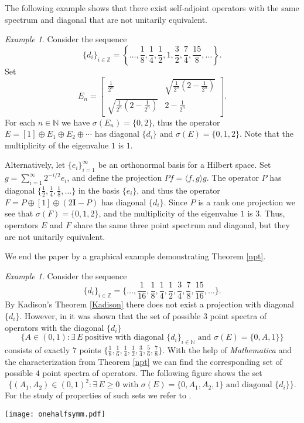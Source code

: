 \documentclass[12pt]{amsart}
\newcounter{Theorem}
\numberwithin{equation}{section}
\numberwithin{Theorem}{section}
\theoremstyle{plain}
\theoremstyle{definition}
\theoremstyle{remark}
\newtheorem{ex}[Theorem]{Example}
\begin{document}
The following example shows that there exist self-adjoint operators with the same spectrum and diagonal that are not unitarily equivalent. 

\begin{ex}\label{nu} Consider the sequence 
\[\{d_{i}\}_{i\in{\mathbb{Z}}} = \left\{\ldots,\frac{1}{8},\frac{1}{4},\frac{1}{2},1,\frac{3}{2},\frac{7}{4},\frac{15}{8},\ldots\right\}.\]
Set
\[E_{n} = \left[\begin{matrix} \frac{1}{2^{n}} & \sqrt{\frac{1}{2^{n}}\left(2-\frac{1}{2^{n}}\right)} \\ \sqrt{\frac{1}{2^{n}}\left(2-\frac{1}{2^{n}}\right)} & 2-\frac{1}{2^{n}}\end{matrix}\right].\]
For each $n\in{\mathbb{N}}$ we have $\sigma(E_{n})=\{0,2\}$, thus the operator $E=[1]\oplus E_{1}\oplus E_{2}\oplus\cdots$ has diagonal $\{d_{i}\}$ and $\sigma(E)=\{0,1,2\}$. Note that the multiplicity of the eigenvalue $1$ is $1$.

Alternatively, let $\{e_{i}\}_{i=1}^{\infty}$ be an orthonormal basis for a Hilbert space. Set $g=\sum_{i=1}^{\infty}2^{-i/2}e_{i}$, and define the projection $Pf = \langle f,g\rangle g$.
 The operator $P$ has diagonal $\{\frac{1}{2},\frac{1}{4},\frac{1}{8},\ldots\}$ in the basis $\{e_{i}\}$, and thus the operator $F=P\oplus[1]\oplus (2\mathbf{I}-P)$ has diagonal $\{d_{i}\}$. Since $P$ is a rank one projection we see that $\sigma(F) = \{0,1,2\}$, and the multiplicity of the eigenvalue $1$ is $3$. Thus, operators $E$ and $F$ share the same three point spectrum and diagonal, but they are not unitarily equivalent.
\end{ex}

We end the paper by a graphical example demonstrating Theorem \ref{npt}.

\begin{ex} Consider the sequence 
\[
\{d_{i}\}_{i\in{\mathbb{Z}}}=\bigg\{\ldots,\frac1{16},\frac18,\frac14,\frac12,\frac34,\frac78,\frac{15}{16},\ldots\bigg\}.
\]
By Kadison's Theorem \ref{Kadison} there does not exist a projection with diagonal $\{d_i\}$. However, in \cite{jj} it was shown that the set of possible $3$ point spectra of operators with the diagonal $\{d_i\}$
\[
\big\{A\in(0,1):\exists\,E\ \text{positive with diagonal }\{d_{i}\}_{i\in{\mathbb{N}}}\text{ and }\sigma(E)=\{0,A,1\}\big\}\]
consists of exactly $7$ points $\{\frac18,\frac16,\frac14,\frac12,\frac34,\frac56,\frac78\}$.
With the help of {\it Mathematica} and the characterization from Theorem \ref{npt} we can find the corresponding set of possible $4$ point spectra of operators. The following figure shows the set 
\[
\big\{(A_{1},A_{2})\in(0,1)^2:\exists\,E\geq 0\text{ with } \sigma(E)=\{0,A_{1},A_{2},1\}\text{ and diagonal } \{d_{i}\}\big\}.
\]
For the study of properties of such sets we refer to \cite{mbjj4}.
\end{ex}
\centerline{\texttt{[image: onehalfsymm.pdf]}}
\end{document}
